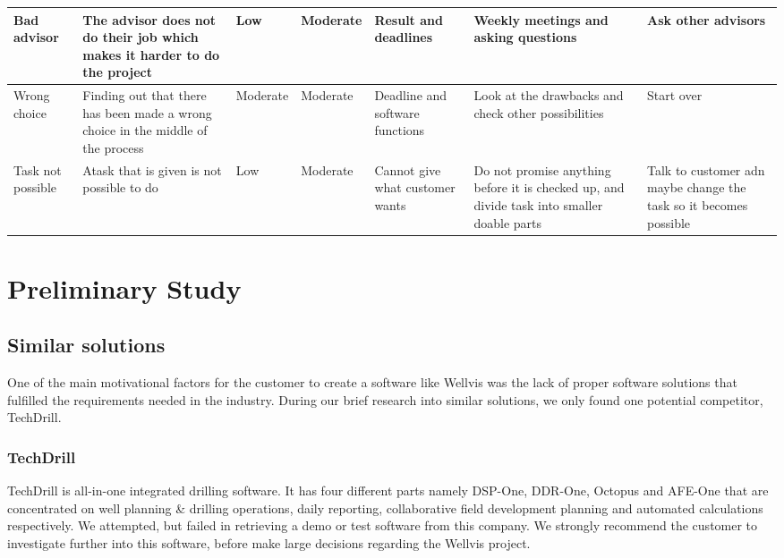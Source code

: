 \documentclass{report}
\begin{document}
\begin{landscape}
\begin{longtable}{| p{3cm} | p{4cm}| l | l | p{3cm} | p{4cm}| p{4cm} |}
Bad advisor & The advisor does not do their job which makes it harder to do the project & Low & Moderate & Result and deadlines & Weekly meetings and asking questions & Ask other advisors \\ \hline
Wrong choice & Finding out that there has been made a wrong choice in the middle of the process & Moderate & Moderate & Deadline and software functions & Look at the drawbacks and check other possibilities & Start over \\ \hline
Task not possible & Atask that is given is not possible to do & Low & Moderate & Cannot give what customer wants & Do not promise anything before it is checked up, and divide task into smaller doable parts & Talk to customer adn maybe change the task so it becomes possible \\ \hline

\end{longtable}
\end{landscape}
\restoregeometry




\chapter{Preliminary Study} \label{cha:preliminary_study}

\section{Similar solutions}

One of the main motivational factors for the customer to create a software like Wellvis was the lack of proper software solutions that fulfilled the requirements needed in the industry. During our brief research into similar solutions, we only found one potential competitor, TechDrill.

\subsection{TechDrill}
TechDrill\cite{website:techdrill} is all-in-one integrated drilling software. It has four different parts namely DSP-One, DDR-One, Octopus and AFE-One that are concentrated on well planning \& drilling operations, daily reporting, collaborative field development planning and automated calculations respectively. We attempted, but failed in retrieving a demo or test software from this company.
We strongly recommend the customer to investigate further into this software, before make large decisions regarding the Wellvis project. 
\end{document}

